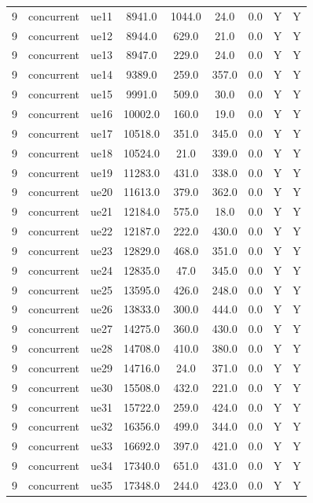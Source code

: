 \begin{table}[ht]
\begin{tabular}{|c|c|c|c|c|c|c|c|c|}
9 & concurrent & ue11 & 8941.0 & 1044.0 & 24.0 & 0.0 & Y & Y \\
9 & concurrent & ue12 & 8944.0 & 629.0 & 21.0 & 0.0 & Y & Y \\
9 & concurrent & ue13 & 8947.0 & 229.0 & 24.0 & 0.0 & Y & Y \\
9 & concurrent & ue14 & 9389.0 & 259.0 & 357.0 & 0.0 & Y & Y \\
9 & concurrent & ue15 & 9991.0 & 509.0 & 30.0 & 0.0 & Y & Y \\
9 & concurrent & ue16 & 10002.0 & 160.0 & 19.0 & 0.0 & Y & Y \\
9 & concurrent & ue17 & 10518.0 & 351.0 & 345.0 & 0.0 & Y & Y \\
9 & concurrent & ue18 & 10524.0 & 21.0 & 339.0 & 0.0 & Y & Y \\
9 & concurrent & ue19 & 11283.0 & 431.0 & 338.0 & 0.0 & Y & Y \\
9 & concurrent & ue20 & 11613.0 & 379.0 & 362.0 & 0.0 & Y & Y \\
9 & concurrent & ue21 & 12184.0 & 575.0 & 18.0 & 0.0 & Y & Y \\
9 & concurrent & ue22 & 12187.0 & 222.0 & 430.0 & 0.0 & Y & Y \\
9 & concurrent & ue23 & 12829.0 & 468.0 & 351.0 & 0.0 & Y & Y \\
9 & concurrent & ue24 & 12835.0 & 47.0 & 345.0 & 0.0 & Y & Y \\
9 & concurrent & ue25 & 13595.0 & 426.0 & 248.0 & 0.0 & Y & Y \\
9 & concurrent & ue26 & 13833.0 & 300.0 & 444.0 & 0.0 & Y & Y \\
9 & concurrent & ue27 & 14275.0 & 360.0 & 430.0 & 0.0 & Y & Y \\
9 & concurrent & ue28 & 14708.0 & 410.0 & 380.0 & 0.0 & Y & Y \\
9 & concurrent & ue29 & 14716.0 & 24.0 & 371.0 & 0.0 & Y & Y \\
9 & concurrent & ue30 & 15508.0 & 432.0 & 221.0 & 0.0 & Y & Y \\
9 & concurrent & ue31 & 15722.0 & 259.0 & 424.0 & 0.0 & Y & Y \\
9 & concurrent & ue32 & 16356.0 & 499.0 & 344.0 & 0.0 & Y & Y \\
9 & concurrent & ue33 & 16692.0 & 397.0 & 421.0 & 0.0 & Y & Y \\
9 & concurrent & ue34 & 17340.0 & 651.0 & 431.0 & 0.0 & Y & Y \\
9 & concurrent & ue35 & 17348.0 & 244.0 & 423.0 & 0.0 & Y & Y \\

\end{tabular}
\end{table}
